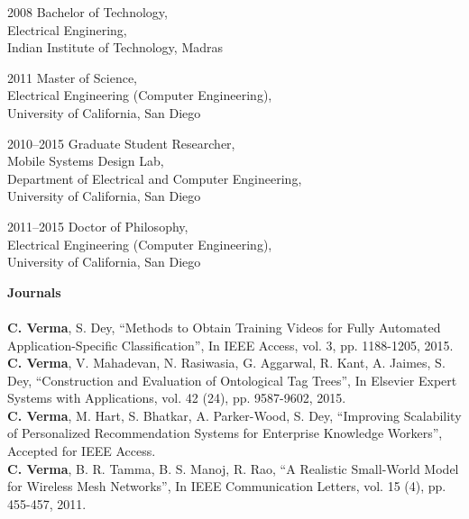 \documentclass[12pt]{ucsddissertation}
\begin{document}
\begin{vita}
\noindent
\begin{cv}{}
\begin{cvlist}{}
\item[2008] Bachelor of Technology, \\Electrical Enginering, \\Indian Institute of Technology, Madras 
\item[2011] Master of Science, \\Electrical Engineering (Computer Engineering), \\University of California, San Diego 
\item[2010--2015] Graduate Student Researcher, \\Mobile Systems Design Lab, \\Department of Electrical and Computer Engineering, \\University of California, San Diego
\item[2011--2015]  Doctor of Philosophy, \\Electrical Engineering (Computer Engineering), \\University of California, San Diego
\end{cvlist}
\end{cv}

\publications
{\justify
\noindent\textbf{Journals} \\ \\
\noindent \textbf{C. Verma}, S. Dey, ``Methods to Obtain Training Videos for Fully Automated Application-Specific Classification'', In IEEE Access, vol. 3, pp. 1188-1205, 2015. \\

\noindent \textbf{C. Verma}, V. Mahadevan, N. Rasiwasia, G. Aggarwal, R. Kant, A. Jaimes, S. Dey, ``Construction and Evaluation of Ontological Tag Trees'', In Elsevier Expert Systems with Applications, vol. 42 (24), pp. 9587-9602, 2015. \\

\noindent \textbf{C. Verma}, M. Hart, S. Bhatkar, A. Parker-Wood, S. Dey, ``Improving Scalability of Personalized Recommendation Systems for Enterprise Knowledge Workers'', Accepted for IEEE Access. \\

\noindent \textbf{C. Verma}, B. R. Tamma, B. S. Manoj, R. Rao, ``A Realistic Small-World Model for Wireless Mesh Networks'', In IEEE Communication Letters, vol. 15 (4), pp. 455-457, 2011. \\

}
\end{vita}
\end{document}
